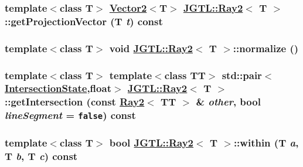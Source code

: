 \hypertarget{class_j_g_t_l_1_1_ray2_e59574fde082ff15adf09d6597782447}{
\subsubsection[getProjectionVector]{\setlength{\rightskip}{0pt plus 5cm}template$<$class T$>$ \hyperlink{class_j_g_t_l_1_1_vector2}{Vector2}$<$T$>$ \hyperlink{class_j_g_t_l_1_1_ray2}{JGTL::Ray2}$<$ T $>$::get\-Projection\-Vector (T {\em t}) const}}
\label{class_j_g_t_l_1_1_ray2_e59574fde082ff15adf09d6597782447}


\hypertarget{class_j_g_t_l_1_1_ray2_ac8af5ab11d2371da705144c47f2913b}{
\subsubsection[normalize]{\setlength{\rightskip}{0pt plus 5cm}template$<$class T$>$ void \hyperlink{class_j_g_t_l_1_1_ray2}{JGTL::Ray2}$<$ T $>$::normalize ()}}
\label{class_j_g_t_l_1_1_ray2_ac8af5ab11d2371da705144c47f2913b}


\hypertarget{class_j_g_t_l_1_1_ray2_f520be1d874ef1679798e3c2b24a23ed}{
\subsubsection[getIntersection]{\setlength{\rightskip}{0pt plus 5cm}template$<$class T$>$ template$<$class TT$>$ std::pair$<$\hyperlink{namespace_j_g_t_l_84ea7d7d885581de216d16c16850615a}{Intersection\-State},float$>$ \hyperlink{class_j_g_t_l_1_1_ray2}{JGTL::Ray2}$<$ T $>$::get\-Intersection (const \hyperlink{class_j_g_t_l_1_1_ray2}{Ray2}$<$ TT $>$ \& {\em other}, bool {\em line\-Segment} = {\tt false}) const}}
\label{class_j_g_t_l_1_1_ray2_f520be1d874ef1679798e3c2b24a23ed}


\hypertarget{class_j_g_t_l_1_1_ray2_c41c241bb8ef64b63d43a9c5aaef78d9}{
\subsubsection[within]{\setlength{\rightskip}{0pt plus 5cm}template$<$class T$>$ bool \hyperlink{class_j_g_t_l_1_1_ray2}{JGTL::Ray2}$<$ T $>$::within (T {\em a}, T {\em b}, T {\em c}) const}}
\label{class_j_g_t_l_1_1_ray2_c41c241bb8ef64b63d43a9c5aaef78d9}


